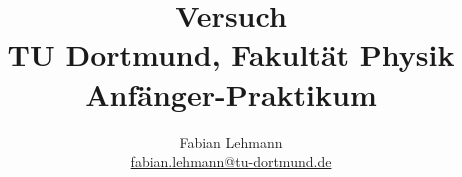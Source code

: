 ﻿%


\renewcommand*\rmdefault{iwona}\normalfont\upshape


\title{Versuch \\				%
\large TU Dortmund, Fakultät Physik\\ 
\normalsize Anfänger-Praktikum}


\author{Fabian Lehmann\\					%
{\small \href{fabian.lehmann@tu-dortmund.de}{fabian.lehmann@tu-dortmund.de}}		%
}

\date{}%





\maketitle					%
\thispagestyle{empty} 				%



\tableofcontents

